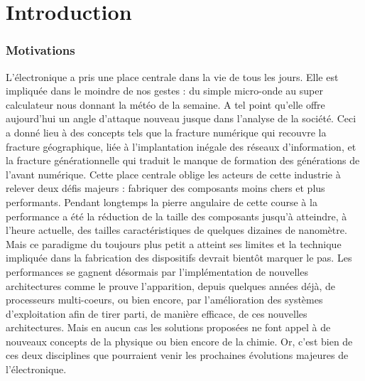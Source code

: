 \chapter*{Introduction}
\setcounter{figure}{0}

\subsection*{Motivations}
L'électronique a pris une place centrale dans la vie de tous les jours. Elle est impliquée dans le moindre de nos gestes : du simple micro-onde au super calculateur nous donnant la météo de la semaine. A tel point qu'elle offre aujourd'hui un angle d'attaque nouveau jusque dans l'analyse de la société. Ceci a donné lieu à des concepts tels que la fracture numérique qui recouvre la fracture géographique, liée à l'implantation inégale des réseaux d'information, et la fracture générationnelle qui traduit le manque de formation des générations de l'avant numérique. Cette place centrale oblige les acteurs de cette industrie à relever deux défis majeurs : fabriquer des composants moins chers et plus performants. Pendant longtemps la pierre angulaire de cette course à la performance a été la réduction de la taille des composants jusqu'à atteindre, à l'heure actuelle, des tailles caractéristiques de quelques dizaines de nanomètre. Mais ce paradigme du toujours plus petit a atteint ses limites et la technique impliquée dans la fabrication des dispositifs devrait bientôt marquer le pas. Les performances se gagnent désormais par l'implémentation de nouvelles architectures comme le prouve l'apparition, depuis quelques années déjà, de processeurs multi-coeurs, ou bien encore, par l'amélioration des systèmes d'exploitation afin de tirer parti, de manière efficace, de ces nouvelles architectures. Mais en aucun cas les solutions proposées ne font appel à de nouveaux concepts de la physique ou bien encore de la chimie. Or, c'est bien de ces deux disciplines que pourraient venir les prochaines évolutions majeures de l'électronique.

